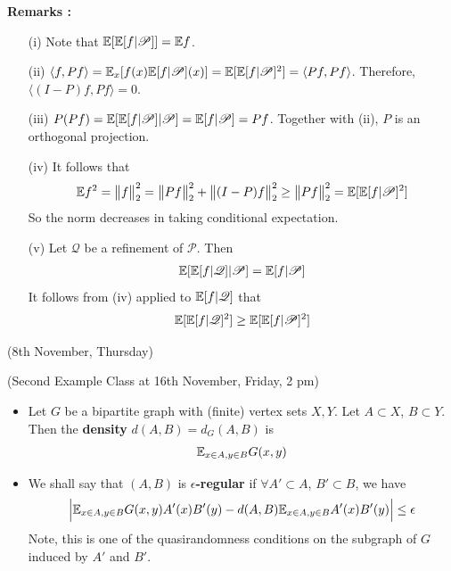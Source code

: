 \documentclass[10pt,a4paper]{report}
\begin{document}
\textbf{Remarks :}
\begin{itemize}
\item[(i)] Note that $\mathbb{E}[\mathbb{E}[f|\mathscr{P}]] = \mathbb{E} f$.
\item[(ii)] $\langle f, Pf \rangle =  \mathbb{E}_x [ f(x) \mathbb{E}[f|\mathscr{P}](x) ] = \mathbb{E} [\mathbb{E}[f|\mathscr{P}]^2 ] = \langle Pf, Pf \rangle$. Therefore, $\langle (I-P)f, Pf \rangle =0$.
\item[(iii)] $P(Pf) = \mathbb{E}[\mathbb{E}[f|\mathscr{P}]|\mathscr{P}] = \mathbb{E}[f| \mathscr{P}] = Pf$. Together with (ii), $P$ is an orthogonal projection.
\item[(iv)] It follows that
\begin{align*}
\mathbb{E} f^2 = \bigl\lVert f\bigr\rVert_{2}^2 = \bigl\lVert Pf\bigr\rVert_{2}^2 + \bigl\lVert(I-P)f\bigr\rVert_{2}^2 \geq \bigl\lVert Pf\bigr\rVert_{2}^2 = \mathbb{E}[\mathbb{E}[f|\mathscr{P}]^2]
\end{align*}
So the norm decreases in taking conditional expectation.
\item[(v)] Let $\mathscr{Q}$ be a refinement of $\mathscr{P}$. Then
\begin{align*}
\mathbb{E}[\mathbb{E}[f|\mathscr{Q}]|\mathscr{P}] = \mathbb{E}[f| \mathscr{P}]
\end{align*}
It follows from (iv) applied to $\mathbb{E}[f|\mathscr{Q}]$ that
\begin{align*}
\mathbb{E}[\mathbb{E}[f|\mathscr{Q}]^2 ] \geq \mathbb{E} [ \mathbb{E}[f|\mathscr{P}]^2 ]
\end{align*}
\end{itemize}
\s

\newday

(8th November, Thursday)
\s

(Second Example Class at 16th November, Friday, 2 pm)
\s

\begin{itemize}
\item Let $G$ be a bipartite graph with (finite) vertex sets $X,Y$. Let $A\subset X$, $B\subset Y$. Then the \textbf{density} $d(A,B)=d_G(A,B)$ is
\begin{align*}
\mathbb{E}_{x\in A, y\in B} G(x,y)
\end{align*}
\item We shall say that $(A,B)$ is \textbf{$\epsilon$-regular} if $\forall A' \subset A$, $B'\subset B$, we have
\begin{align*}
\Big| \mathbb{E}_{x\in A, y\in B} G(x,y) A'(x) B'(y) - d(A,B)\mathbb{E}_{x\in A, y\in B}A'(x)B'(y) \Big| \leq \epsilon
\end{align*}
Note, this is one of the quasirandomness conditions on the subgraph of $G$ induced by $A'$ and $B'$.
\end{itemize}
\s
\end{document}
